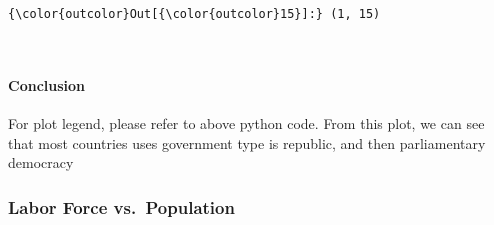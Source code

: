 \documentclass{article}
\begin{document}
            \begin{Verbatim}[commandchars=\\\{\}]
{\color{outcolor}Out[{\color{outcolor}15}]:} (1, 15)
\end{Verbatim}
        
    \begin{center}
    \end{center}
    { \hspace*{\fill} \\}
    
    \paragraph{Conclusion}\label{conclusion}

For plot legend, please refer to above python code. From this plot, we
can see that most countries uses government type is republic, and then
parliamentary democracy

    \subsubsection{Labor Force
vs.~Population}\label{labor-force-vs.population}
\end{document}
